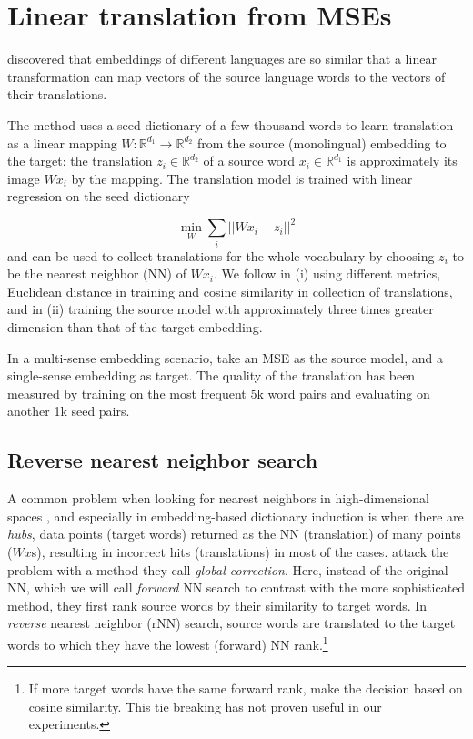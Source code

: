 \documentclass[11pt]{article}
\newcommand{\Ro}{\mathbb{R}^{d_1}}
\newcommand{\Rt}{\mathbb{R}^{d_2}}
\begin{document}
\section{Linear translation from MSEs}
\label{sec:linTrans}

\cite{Mikolov:2013x} discovered that embeddings of different languages are so
similar that a linear transformation can map vectors of the source language
words to the vectors of their translations.

The method uses a seed dictionary of a few thousand words to learn translation
as a linear mapping $W: \mathbb{R}^{d_1}\rightarrow \mathbb{R}^{d_2}$ from the
source (monolingual) embedding to the target: the translation $z_i \in \Rt$ of
a source word $x_i \in \Ro$ is approximately its image $Wx_i$ by the mapping.
The translation model is trained with linear regression on the seed dictionary

\[\min_W \sum_i || Wx_i - z_i ||^2 \]
and can be used to collect translations for the whole vocabulary by choosing
$z_i$ to be the nearest neighbor (NN) of $Wx_i$.  We follow
\cite{Mikolov:2013x} in (i) using different metrics, Euclidean distance in training
and cosine similarity in collection of translations, and in (ii) training the
source model with approximately three times greater dimension than that of the
target embedding.

In a multi-sense embedding scenario, \cite{Borbely:2016} take an MSE as the
source model, and a single-sense embedding as target.  The quality of the
translation has been measured by training on the most frequent 5k word pairs
and evaluating on another 1k seed pairs.

\subsection{Reverse nearest neighbor search}


A common problem when looking for nearest neighbors in high-dimensional spaces
\citep{Radovanovic:2010,Suzuki:2013,Tomasev:2013}, and especially in
embedding-based dictionary induction \citep{Dinu:2015,Lazaridou:2015} is when
there are \emph{hubs}, data points (target words) returned as the NN
(translation) of many points ($Wx$s), resulting in incorrect hits (translations) in most of
the cases.  \cite{Dinu:2015} attack the problem with a method they call
\emph{global correction}.  Here, instead of the original NN, which we will call
\emph{forward} NN search to contrast with the more sophisticated method, they
first rank source words by their similarity to target words. In \emph{reverse}
nearest neighbor (rNN) search, source words are translated to the target words
to which they have the lowest (forward) NN rank.\footnote{If more target words
have the same forward rank, \cite{Dinu:2015} make the decision based on cosine
similarity. This tie breaking has not proven useful in our experiments.}
\end{document}
